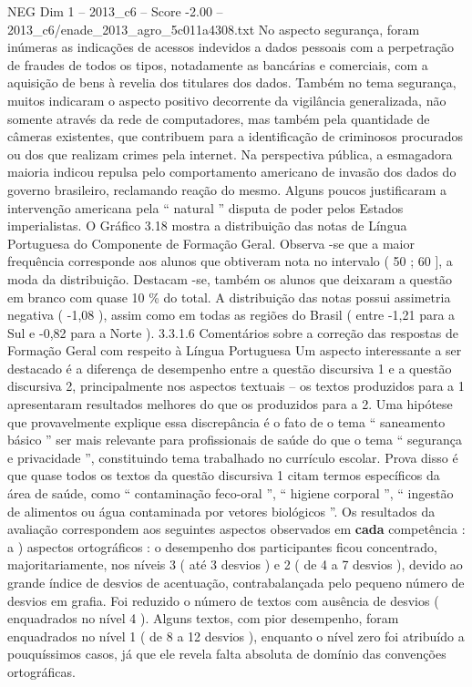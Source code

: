 \begin{textsample}{NEG Dim 1 – 2013\_c6 – Score -2.00 – 2013\_c6/enade\_2013\_agro\_5c011a4308.txt}
No aspecto segurança, foram inúmeras as indicações de acessos indevidos a dados pessoais com a perpetração de fraudes de todos os tipos, notadamente as bancárias e comerciais, com a aquisição de bens à revelia dos titulares dos dados.
Também no tema segurança, muitos indicaram o aspecto positivo decorrente da vigilância generalizada, não somente através da rede de computadores, mas também pela quantidade de câmeras existentes, que contribuem para a identificação de criminosos procurados ou dos que realizam crimes pela internet.
Na perspectiva pública, a esmagadora maioria indicou repulsa pelo comportamento americano de invasão dos dados do governo brasileiro, reclamando reação do mesmo.
Alguns poucos justificaram a intervenção americana pela “ natural ” disputa de poder pelos Estados imperialistas.
O Gráfico 3.18 mostra a distribuição das notas de Língua Portuguesa do Componente de Formação Geral.
Observa -se que a maior frequência corresponde aos alunos que obtiveram nota no intervalo ( 50 ; 60 ], a moda da distribuição.
Destacam -se, também os alunos que deixaram a questão em branco com quase 10 \% do total.
A distribuição das notas possui assimetria negativa ( -1,08 ), assim como em todas as regiões do Brasil ( entre -1,21 para a Sul e -0,82 para a Norte ). 3.3.1.6 Comentários sobre a correção das respostas de Formação Geral com respeito à Língua Portuguesa Um aspecto interessante a ser destacado é a diferença de desempenho entre a questão discursiva 1 e a questão discursiva 2, principalmente nos aspectos textuais – os textos produzidos para a 1 apresentaram resultados melhores do que os produzidos para a 2.
Uma hipótese que provavelmente explique essa discrepância é o fato de o tema “ saneamento básico ” ser mais relevante para profissionais de saúde do que o tema “ segurança e privacidade ”, constituindo tema trabalhado no currículo escolar.
Prova disso é que quase todos os textos da questão discursiva 1 citam termos específicos da área de saúde, como “ contaminação feco-oral ”, “ higiene corporal ”, “ ingestão de alimentos ou água contaminada por vetores biológicos ”.
Os resultados da avaliação correspondem aos seguintes aspectos observados em \textbf{cada} competência : a ) aspectos ortográficos : o desempenho dos participantes ficou concentrado, majoritariamente, nos níveis 3 ( até 3 desvios ) e 2 ( de 4 a 7 desvios ), devido ao grande índice de desvios de acentuação, contrabalançada pelo pequeno número de desvios em grafia.
Foi reduzido o número de textos com ausência de desvios ( enquadrados no nível 4 ).
Alguns textos, com pior desempenho, foram enquadrados no nível 1 ( de 8 a 12 desvios ), enquanto o nível zero foi atribuído a pouquíssimos casos, já que ele revela falta absoluta de domínio das convenções ortográficas.

\end{textsample}
